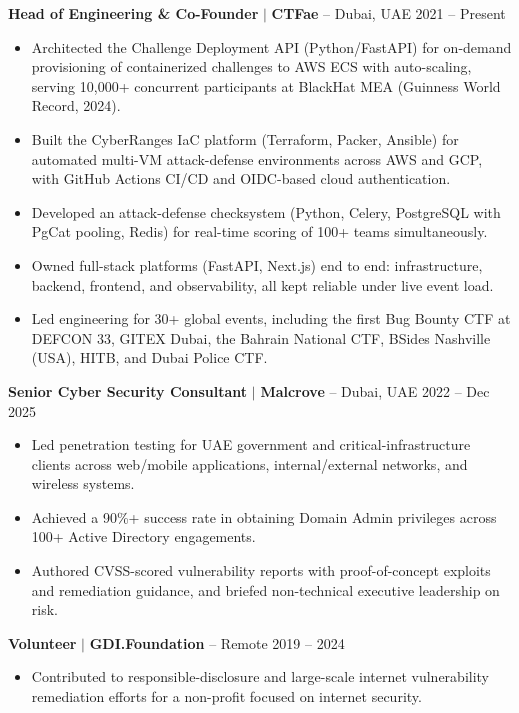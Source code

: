 \documentclass[10pt,a4paper]{article}
\begin{document}
{\small\textbf{Head of Engineering \& Co-Founder} $\mid$ \textbf{CTFae} -- Dubai, UAE \hfill 2021 -- Present}
\begin{itemize}
    \item {\small Architected the Challenge Deployment API (Python/FastAPI) for on-demand provisioning of containerized challenges to AWS ECS with auto-scaling, serving 10,000+ concurrent participants at BlackHat MEA (Guinness World Record, 2024).}
    \item {\small Built the CyberRanges IaC platform (Terraform, Packer, Ansible) for automated multi-VM attack-defense environments across AWS and GCP, with GitHub Actions CI/CD and OIDC-based cloud authentication.}
    \item {\small Developed an attack-defense checksystem (Python, Celery, PostgreSQL with PgCat pooling, Redis) for real-time scoring of 100+ teams simultaneously.}
    \item {\small Owned full-stack platforms (FastAPI, Next.js) end to end: infrastructure, backend, frontend, and observability, all kept reliable under live event load.}
    \item {\small Led engineering for 30+ global events, including the first Bug Bounty CTF at DEFCON 33, GITEX Dubai, the Bahrain National CTF, BSides Nashville (USA), HITB, and Dubai Police CTF.}
\end{itemize}

\vspace{3pt}

{\small\textbf{Senior Cyber Security Consultant} $\mid$ \textbf{Malcrove} -- Dubai, UAE \hfill 2022 -- Dec 2025}
\begin{itemize}
    \item {\small Led penetration testing for UAE government and critical-infrastructure clients across web/mobile applications, internal/external networks, and wireless systems.}
    \item {\small Achieved a 90\%+ success rate in obtaining Domain Admin privileges across 100+ Active Directory engagements.}
    \item {\small Authored CVSS-scored vulnerability reports with proof-of-concept exploits and remediation guidance, and briefed non-technical executive leadership on risk.}
\end{itemize}

\vspace{3pt}

{\small\textbf{Volunteer} $\mid$ \textbf{GDI.Foundation} -- Remote \hfill 2019 -- 2024}
\begin{itemize}
    \item {\small Contributed to responsible-disclosure and large-scale internet vulnerability remediation efforts for a non-profit focused on internet security.}
\end{itemize}
\end{document}
